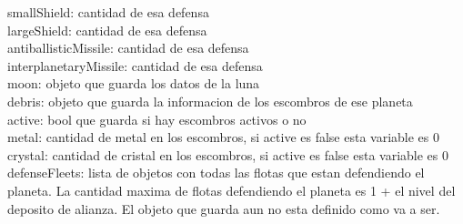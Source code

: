 \documentclass{article}
\newcommand\tab[1][1cm]{\hspace*{#1}}
\begin{document}
            \tab\tab smallShield: cantidad de esa defensa\\
            \tab\tab largeShield: cantidad de esa defensa\\
            \tab\tab antiballisticMissile: cantidad de esa defensa\\
            \tab\tab interplanetaryMissile: cantidad de esa defensa\\
            \tab moon: objeto que guarda los datos de la luna\\
            \tab debris: objeto que guarda la informacion de los escombros de ese planeta\\
            \tab\tab active: bool que guarda si hay escombros activos o no\\
            \tab\tab metal: cantidad de metal en los escombros, si active es false esta variable es 0\\
            \tab\tab crystal: cantidad de cristal en los escombros, si active es false esta variable es 0\\
            \tab defenseFleets: lista de objetos con todas las flotas que estan defendiendo el planeta. La cantidad maxima de flotas defendiendo el planeta es 1 + el nivel del deposito de alianza. El objeto que guarda aun no esta definido como va a ser.\\
\end{document}

